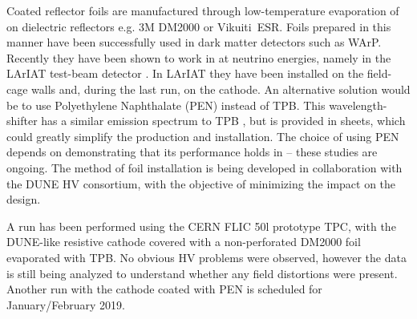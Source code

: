 Coated reflector foils are manufactured through low-temperature evaporation of  on dielectric reflectors e.g. 3M DM2000 or Vikuiti\texttrademark\  ESR. Foils prepared in this manner have been successfully used in dark matter detectors such as WArP\cite{Acciarri:2008kv}. Recently they have been shown to work in  at neutrino energies, namely  in the LArIAT test-beam detector \cite{Garcia-Gamez:2017cmu}. In LArIAT they have been installed on the field-cage walls and, during the last run, on the cathode. An alternative solution would be to use Polyethylene Naphthalate (PEN) instead of TPB. This wavelength-shifter has a similar emission spectrum to TPB \cite{Kuzniak:2018dcf}, but is provided in sheets, which could greatly simplify the production and installation. The choice of using PEN depends on demonstrating that its performance holds in \lar -- these studies are ongoing. 
The method of foil installation is being developed in collaboration with the DUNE HV consortium, with the objective of minimizing the impact on the  design. 

A run has been performed using the CERN FLIC 50l prototype TPC, with
the DUNE-like resistive cathode covered with a non-perforated DM2000
foil evaporated with TPB. No obvious HV problems were observed, however
the data is still being analyzed to understand whether any field
distortions were present.  Another run with the cathode coated with PEN
is scheduled for January/February 2019.



